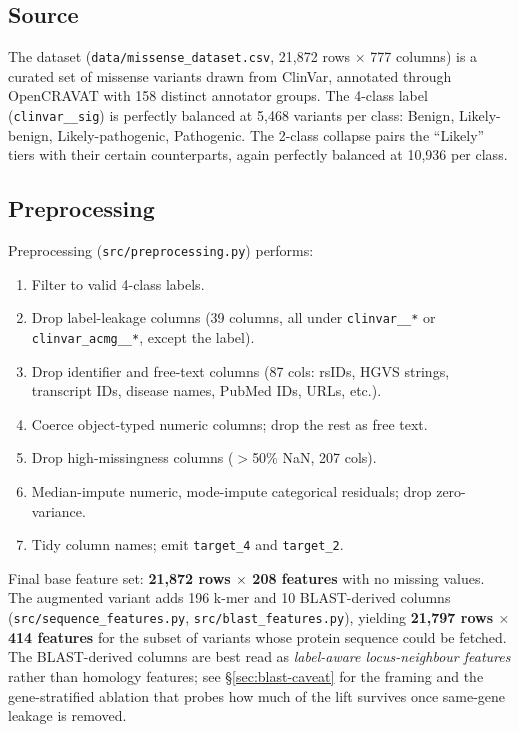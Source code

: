 \documentclass[11pt,a4paper]{article}
\begin{document}
\subsection{Source}

The dataset (\texttt{data/missense\_dataset.csv}, 21{,}872 rows $\times$ 777 columns)
is a curated set of missense variants drawn from ClinVar, annotated through
OpenCRAVAT with 158 distinct annotator groups. The 4-class label
(\texttt{clinvar\_\_sig}) is perfectly balanced at 5{,}468 variants per class:
Benign, Likely-benign, Likely-pathogenic, Pathogenic. The 2-class collapse pairs the
``Likely'' tiers with their certain counterparts, again perfectly balanced at 10{,}936
per class.

\subsection{Preprocessing}

Preprocessing (\texttt{src/preprocessing.py}) performs:
\begin{enumerate}[leftmargin=*]
    \item Filter to valid 4-class labels.
    \item Drop label-leakage columns (39 columns, all under \texttt{clinvar\_\_*} or
          \texttt{clinvar\_acmg\_\_*}, except the label).
    \item Drop identifier and free-text columns (87 cols: rsIDs, HGVS strings,
          transcript IDs, disease names, PubMed IDs, URLs, etc.).
    \item Coerce object-typed numeric columns; drop the rest as free text.
    \item Drop high-missingness columns ($>$50\% NaN, 207 cols).
    \item Median-impute numeric, mode-impute categorical residuals; drop zero-variance.
    \item Tidy column names; emit \texttt{target\_4} and \texttt{target\_2}.
\end{enumerate}
Final base feature set: \textbf{21{,}872 rows $\times$ 208 features} with no missing values.
The augmented variant adds 196 k-mer and 10 BLAST-derived columns
(\texttt{src/sequence\_features.py}, \texttt{src/blast\_features.py}), yielding
\textbf{21{,}797 rows $\times$ 414 features} for the subset of variants whose protein
sequence could be fetched. The BLAST-derived columns are best read as
\emph{label-aware locus-neighbour features} rather than homology features; see
\S\ref{sec:blast-caveat} for the framing and the gene-stratified ablation
that probes how much of the lift survives once same-gene leakage is removed.
\end{document}
